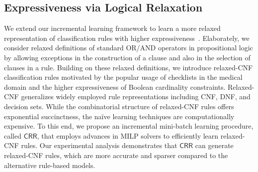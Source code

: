 \subsection*{Expressiveness via Logical Relaxation}
We extend our incremental learning framework to learn a more relaxed representation of classification rules with higher expressiveness~\cite{GMM2020}. Elaborately, we consider relaxed definitions of standard OR/AND operators in propositional logic by allowing exceptions in the construction of a clause and also in the selection of clauses in a rule. Building on these relaxed definitions, we introduce relaxed-CNF classification rules motivated by the popular usage of checklists in the medical domain and the higher expressiveness of Boolean cardinality constraints. Relaxed-CNF generalizes widely employed rule representations including CNF, DNF, and decision sets. While the combinatorial structure of relaxed-CNF rules offers exponential succinctness, the na\"ive learning techniques are computationally expensive. To this end, we propose an incremental mini-batch learning procedure, called $ \mathsf{CRR} $, that employs advances in MILP solvers to efficiently learn relaxed-CNF rules. Our experimental analysis demonstrates that $ \mathsf{CRR} $ can generate relaxed-CNF rules, which are more accurate and sparser compared to the alternative rule-based models.







